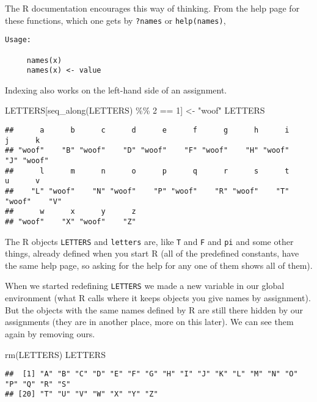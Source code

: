 \documentclass[
]{article}
\newenvironment{Shaded}{\begin{snugshade}}{\end{snugshade}}
\newcommand{\DecValTok}[1]{\textcolor[rgb]{0.00,0.00,0.81}{#1}}
\newcommand{\FunctionTok}[1]{\textcolor[rgb]{0.00,0.00,0.00}{#1}}
\newcommand{\NormalTok}[1]{#1}
\newcommand{\OtherTok}[1]{\textcolor[rgb]{0.56,0.35,0.01}{#1}}
\newcommand{\SpecialCharTok}[1]{\textcolor[rgb]{0.00,0.00,0.00}{#1}}
\newcommand{\StringTok}[1]{\textcolor[rgb]{0.31,0.60,0.02}{#1}}
\begin{document}
The R documentation encourages this way of thinking. From the help page
for these functions, which one gets by \texttt{?names} or
\texttt{help(names)},

\begin{verbatim}
Usage:

     names(x)
     names(x) <- value
\end{verbatim}

Indexing also works on the left-hand side of an assignment.

\begin{Shaded}
\begin{Highlighting}[]
\NormalTok{LETTERS[}\FunctionTok{seq\_along}\NormalTok{(LETTERS) }\SpecialCharTok{\%\%} \DecValTok{2} \SpecialCharTok{==} \DecValTok{1}\NormalTok{] }\OtherTok{\textless{}{-}} \StringTok{"woof"}
\NormalTok{LETTERS}
\end{Highlighting}
\end{Shaded}

\begin{verbatim}
##      a      b      c      d      e      f      g      h      i      j      k 
## "woof"    "B" "woof"    "D" "woof"    "F" "woof"    "H" "woof"    "J" "woof" 
##      l      m      n      o      p      q      r      s      t      u      v 
##    "L" "woof"    "N" "woof"    "P" "woof"    "R" "woof"    "T" "woof"    "V" 
##      w      x      y      z 
## "woof"    "X" "woof"    "Z"
\end{verbatim}

The R objects \texttt{LETTERS} and \texttt{letters} are, like \texttt{T}
and \texttt{F} and \texttt{pi} and some other things, already defined
when you start R (all of the predefined constants, have the same help
page, so asking for the help for any one of them shows all of them).

When we started redefining \texttt{LETTERS} we made a new variable in
our global environment (what R calls where it keeps objects you give
names by assignment). But the objects with the same names defined by R
are still there hidden by our assignments (they are in another place,
more on this later). We can see them again by removing ours.

\begin{Shaded}
\begin{Highlighting}[]
\FunctionTok{rm}\NormalTok{(LETTERS)}
\NormalTok{LETTERS}
\end{Highlighting}
\end{Shaded}

\begin{verbatim}
##  [1] "A" "B" "C" "D" "E" "F" "G" "H" "I" "J" "K" "L" "M" "N" "O" "P" "Q" "R" "S"
## [20] "T" "U" "V" "W" "X" "Y" "Z"
\end{verbatim}
\end{document}
